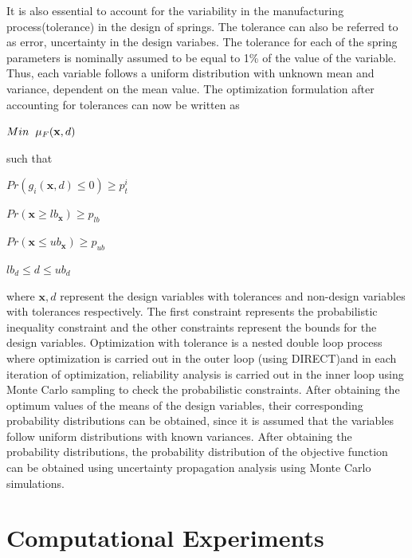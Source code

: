 \documentclass[10pt]{article}
\begin{document}
\hspace{5 mm} It is also essential to account for the variability in the manufacturing process(tolerance) in the design of springs. The tolerance can also be referred to as error, uncertainty in the design variabes. The tolerance for each of the spring parameters is nominally assumed to be equal to 1\% of the value of the variable. Thus, each variable follows a uniform distribution with unknown mean and variance, dependent on the mean value. The optimization formulation after accounting for tolerances can now be written as 

\centerline{$Min \hspace{2mm} \mu_{F} (\textbf{x},d)$}

such that

\centerline{$Pr(g_{i}(\textbf{x},d) \leq 0)\geq p_{t}^{i}$}
\centerline{$Pr(\textbf{x} \geq lb_{\textbf{x}})\geq p_{lb}$}
\centerline{$Pr(\textbf{x} \leq ub_{\textbf{x}})\geq p_{ub}$}
\centerline{$lb_{d} \leq d \leq ub_{d}$}

\noindent where $\mathbf{x},d$ represent the design variables with tolerances and non-design variables with tolerances respectively. The first constraint represents the probabilistic inequality constraint and the other constraints represent the bounds for the design variables. Optimization with tolerance is a nested double loop process where optimization is carried out in the outer loop (using DIRECT)and in each iteration of optimization, reliability analysis is carried out in the inner loop using Monte Carlo sampling to check the probabilistic constraints. After obtaining the optimum values of the means of the design variables, their corresponding probability distributions can be obtained, since it is assumed that the variables follow uniform distributions with known variances. After obtaining the probability distributions, the probability distribution of the objective function can be obtained using uncertainty propagation analysis using Monte Carlo simulations.

\cite{Derivative} \cite{DirectPaper} \cite{MATLAB:2014a} \cite{DirectUserGuide}
 

\section{Computational Experiments}
\label{sec:Computational_Experiments}
\end{document}
